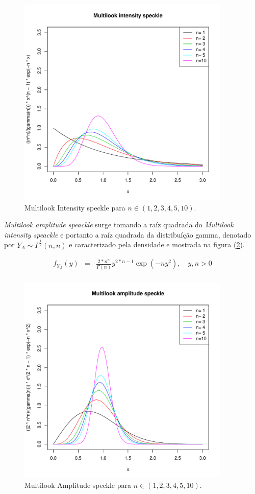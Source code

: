 \documentclass[12pt,a4paper]{article}
\begin{document}
\begin{figure}[!htb]
\centering
\includegraphics[width=4.0in]{fig_eq_fyi_frery_muller_1997.pdf}
	\caption{Multilook Intensity speckle  para $n\in(1,2,3,4,5,10)$.}
\label{sec61fig1}
\end{figure}

{\it Multilook amplitude speackle} surge tomando a raíz quadrada do {\it Multilook intensity speackle} e portanto a raíz quadrada da distribuíção gamma, denotado por $Y_{A}\sim \Gamma^{\frac{1}{2}}(n,n)$ e caracterizado pela densidade e mostrada na figura  (\ref{sec61fig2}).

\begin{equation}\label{sec61eqn2}
\begin{array}{ccc}
	f_{Y_{A}}(y)&=&\frac{2*n^{n}}{\Gamma(n)}y^{2*n-1}\exp\left(-ny^2\right),\quad y,n>0 \\
\end{array}
\end{equation}
\begin{figure}[!htb]
\centering
\includegraphics[width=4.0in]{fig_eq_fya_frery_muller_1997.pdf}
	\caption{Multilook Amplitude speckle  para $n\in(1,2,3,4,5,10)$.}
\label{sec61fig2}
\end{figure}
\end{document}
